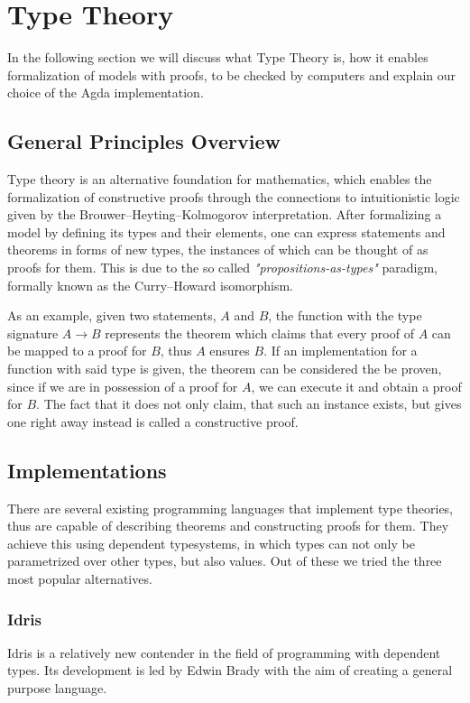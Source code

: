 \section{Type Theory}
In the following section we will discuss what Type Theory is, how it enables formalization of models with proofs, to be checked by computers and explain our choice of the Agda implementation.

\subsection{General Principles Overview}

Type theory is an alternative foundation for mathematics, which enables the formalization of constructive proofs through the connections to intuitionistic logic given by the Brouwer–Heyting–Kolmogorov interpretation. After formalizing a model by defining its types and their elements, one can express statements and theorems in forms of new types, the instances of which can be thought of as proofs for them.
This is due to the so called \textit{"propositions-as-types"} paradigm, formally known as the Curry–Howard isomorphism.

As an example, given two statements, $A$ and $B$, the function with the type signature $A \to B$ represents the theorem which claims that every proof of $A$ can be mapped to a proof for $B$, thus $A$ ensures $B$. If an implementation for a function with said type is given, the theorem can be considered the be proven, since if we are in possession of a proof for $A$, we can execute it and obtain a proof for $B$. The fact that it does not only claim, that such an instance exists, but gives one right away instead is called a constructive proof.

\subsection{Implementations}
There are several existing programming languages that implement type theories, thus are capable of describing theorems and constructing proofs for them. They achieve this using dependent typesystems, in which types can not only be parametrized over other types, but also values. Out of these we tried the three most popular alternatives.

\subsubsection{Idris}
Idris\cite{Brady2013IdrisAG} is a relatively new contender in the field of programming with dependent types. Its development is led by Edwin Brady with the aim of creating a general purpose language.

